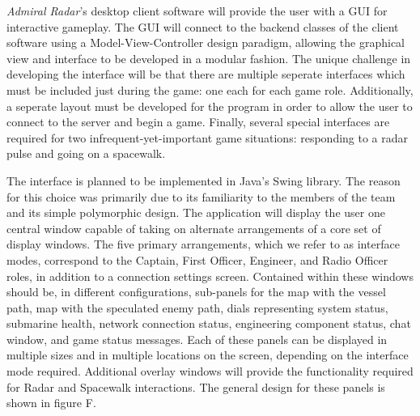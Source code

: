 	\textit{Admiral Radar}'s desktop client software will provide the user with a GUI for interactive gameplay. The GUI will connect to the backend classes of the client software using a Model-View-Controller design paradigm, allowing the graphical view and interface to be developed in a modular fashion. The unique challenge in developing the interface will be that there are multiple seperate interfaces which must be included just during the game: one each for each game role. Additionally, a seperate layout must be developed for the program in order to allow the user to connect to the server and begin a game. Finally, several special interfaces are required for two infrequent-yet-important game situations: responding to a radar pulse and going on a spacewalk. 

	The interface is planned to be implemented in Java's Swing library. The reason for this choice was primarily due to its familiarity to the members of the team and its simple polymorphic design. The application will display the user one central window capable of taking on alternate arrangements of a core set of display windows. The five primary arrangements, which we refer to as interface modes, correspond to the Captain, First Officer, Engineer, and Radio Officer roles, in addition to a connection settings screen. Contained within these windows should be, in different configurations, sub-panels for the map with the vessel path, map with the speculated enemy path, dials representing system status, submarine health, network connection status, engineering component status, chat window, and game status messages. Each of these panels can be displayed in multiple sizes and in multiple locations on the screen, depending on the interface mode required. Additional overlay windows will provide the functionality required for Radar and Spacewalk interactions. The general design for these panels is shown in figure F.









